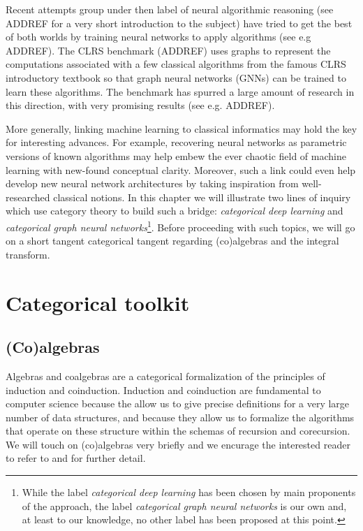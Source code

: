 \documentclass[12pt,a4paper,openright,twoside]{report}
\theoremstyle{plain}
\theoremstyle{definition}
\begin{document}
Recent attempts group under then label of neural algorithmic reasoning (see ADDREF for a very short introduction to the subject) have tried to get the best of both worlds by training neural networks to apply algorithms (see e.g ADDREF). The CLRS benchmark (ADDREF) uses graphs to represent the computations associated with a few classical algorithms from the famous CLRS introductory textbook so that graph neural networks (GNNs) can be trained to learn these algorithms. The benchmark has spurred a large amount of research in this direction, with very promising results (see e.g. ADDREF).


More generally, linking machine learning to classical informatics may hold the key for interesting advances. For example, recovering neural networks as parametric versions of known algorithms may help embew the ever chaotic field of machine learning with new-found conceptual clarity. Moreover, such a link could even help develop new neural network architectures by taking inspiration from well-researched classical notions. In this chapter we will illustrate two lines of inquiry which use category theory to build such a bridge: \textit{categorical deep learning} and \textit{categorical graph neural networks}\footnote{While the label \textit{categorical deep learning} has been chosen by main proponents of the approach, the label \textit{categorical graph neural networks} is our own and, at least to our knowledge, no other label has been proposed at this point.}. Before proceeding with such topics, we will go on a short tangent categorical tangent regarding (co)algebras and the integral transform.




\section{Categorical toolkit}

\subsection{(Co)algebras}
\label{subsec: algebras}

Algebras and coalgebras are a categorical formalization of the principles of induction and coinduction. Induction and coinduction are fundamental to computer science because the allow us to give precise definitions for a very large number of data structures, and because they allow us to formalize the algorithms that operate on these structure within the schemas of recursion and corecursion. We will touch on (co)algebras very briefly and we encurage the interested reader to refer to \cite{jacobs1997tutorial} and \cite{wisbauer2008algebras} for further detail.
\end{document}
